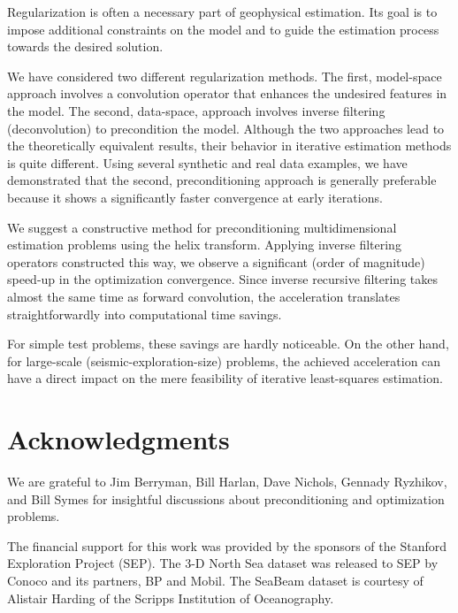 Regularization is often a necessary part of geophysical estimation.
Its goal is to impose additional constraints on the model and
to guide the estimation process towards the desired solution.

We have considered two different regularization methods. The first,
model-space approach involves a convolution operator that enhances the
undesired features in the model. The second, data-space, approach
involves inverse filtering (deconvolution) to precondition the model.
Although the two approaches lead to the theoretically equivalent
results, their behavior in iterative estimation methods is quite
different. Using several synthetic and real data examples, we have
demonstrated that the second, preconditioning approach is generally
preferable because it shows a significantly faster convergence at 
early iterations.

We suggest a constructive method for preconditioning multidimensional
estimation problems using the helix transform. Applying inverse
filtering operators constructed this way, we observe a significant
(order of magnitude) speed-up in the optimization convergence. Since
inverse recursive filtering takes almost the same time as forward
convolution, the acceleration translates straightforwardly into
computational time savings.
\par
For simple test problems, these savings are hardly noticeable. On the
other hand, for large-scale (seismic-exploration-size) problems, the
achieved acceleration can have a direct impact on the mere feasibility
of iterative least-squares estimation.

\section{Acknowledgments}
We are grateful to Jim Berryman, Bill Harlan, Dave Nichols, Gennady
Ryzhikov, and Bill Symes for insightful discussions about
preconditioning and optimization problems.

The financial support for this work was provided by the sponsors of
the Stanford Exploration Project (SEP). The 3-D North Sea dataset was
released to SEP by Conoco and its partners, BP and Mobil. The SeaBeam
dataset is courtesy of Alistair Harding of the Scripps Institution of
Oceanography.





%
%

